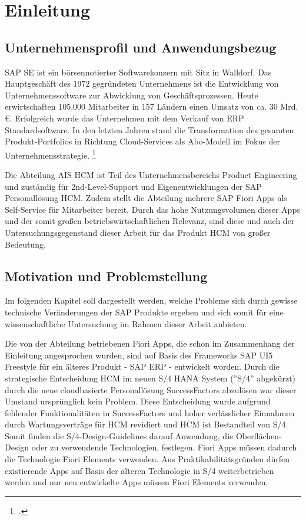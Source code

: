 \chapter{Einleitung}

\section{Unternehmensprofil und Anwendungsbezug}

SAP SE ist ein börsennotierter Softwarekonzern mit Sitz in Walldorf. Das Hauptgeschäft des 1972 gegründeten Unternehmens ist die Entwicklung von Unternehmenssoftware zur Abwicklung von Geschäftsprozessen. Heute erwirtschaften 105.000 Mitarbeiter in 157 Ländern einen Umsatz von ca. 30 Mrd. \euro{}. Erfolgreich wurde das Unternehmen mit dem Verkauf von ERP Standardsoftware. In den letzten Jahren stand die Transformation des gesamten Produkt-Portfolios in Richtung Cloud-Services als Abo-Modell im Fokus der Unternehmensstrategie. \footcite[Vgl.][]{sap_geschichte_2023}

Die Abteilung AIS HCM ist Teil des Unternehmensbereichs Product Engineering und zuständig für 2nd-Level-Support und Eigenentwicklungen der SAP Personallösung HCM. Zudem stellt die Abteilung mehrere SAP Fiori Apps als Self-Service für Mitarbeiter bereit. Durch das hohe Nutzungsvolumen dieser Apps und der somit gro{\ss}en betriebswirtschaftlichen Relevanz, sind diese und auch der Untersuchungsgegenstand dieser Arbeit für das Produkt HCM von gro{\ss}er Bedeutung.

\section{Motivation und Problemstellung}

Im folgenden Kapitel soll dargestellt werden, welche Probleme sich durch gewisse technische Veränderungen der SAP Produkte ergeben und sich somit für eine wissenschaftliche Untersuchung im Rahmen dieser Arbeit anbieten.

Die von der Abteilung betriebenen Fiori Apps, die schon im Zusammenhang der Einleitung angesprochen wurden, sind auf Basis des Frameworks SAP UI5 Freestyle für ein älteres Produkt - SAP ERP - entwickelt worden. Durch die strategische Entscheidung HCM im neuen S/4 HANA System (''S/4'' abgekürzt) durch die neue cloudbasierte Personallösung SuccessFactors abzulösen war dieser Umstand ursprünglich kein Problem. Diese Entscheidung wurde aufgrund fehlender Funktionalitäten in SuccessFactors und hoher verlässlicher Einnahmen durch Wartungsverträge für HCM revidiert und HCM ist Bestandteil von S/4. Somit finden die S/4-Design-Guidelines darauf Anwendung, die \zB Oberflächen-Design oder zu verwendende Technologien, festlegen. Fiori Apps müssen dadurch die Technologie Fiori Elements verwenden. Aus Praktikabilitätsgründen dürfen existierende Apps auf Basis der älteren Technologie in S/4 weiterbetrieben werden und nur neu entwickelte Apps müssen Fiori Elements verwenden.

